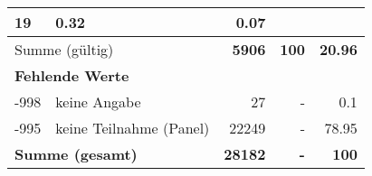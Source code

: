 \begin{longtable}{lXrrr}
       \num{19} &
       \num[round-mode=places,round-precision=2]{0.32} &
         \num[round-mode=places,round-precision=2]{0.07} \\
     \midrule
     \multicolumn{2}{l}{Summe (gültig)} &
       \textbf{\num{5906}} &
     \textbf{100} &
       \textbf{\num[round-mode=places,round-precision=2]{20.96}} \\
     \multicolumn{5}{l}{\textbf{Fehlende Werte}}\\
       -998 &
       keine Angabe &
         \num{27} &
        - &
         \num[round-mode=places,round-precision=2]{0.1} \\
       -995 &
       keine Teilnahme (Panel) &
         \num{22249} &
        - &
         \num[round-mode=places,round-precision=2]{78.95} \\
     \midrule
     \multicolumn{2}{l}{\textbf{Summe (gesamt)}} &
          \textbf{\num{28182}} &
        \textbf{-} &
        \textbf{100} \\
     \bottomrule
     \end{longtable}
     
